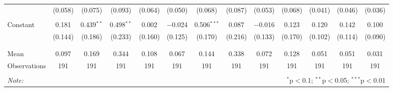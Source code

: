 \begin{tabular}{@{\extracolsep{5pt}}lcccccccccccc}
  & (0.058) & (0.075) & (0.093) & (0.064) & (0.050) & (0.068) & (0.087) & (0.053) & (0.068) & (0.041) & (0.046) & (0.036) \\ 
  & & & & & & & & & & & & \\ 
 Constant & 0.181 & 0.439$^{**}$ & 0.498$^{**}$ & 0.002 & $-$0.024 & 0.506$^{***}$ & 0.087 & $-$0.016 & 0.123 & 0.120 & 0.142 & 0.100 \\ 
  & (0.144) & (0.186) & (0.233) & (0.160) & (0.125) & (0.170) & (0.216) & (0.133) & (0.170) & (0.102) & (0.114) & (0.090) \\ 
  & & & & & & & & & & & & \\ 
\hline \\[-1.8ex] 
Mean & 0.097 & 0.169 & 0.344 & 0.108 & 0.067 & 0.144 & 0.338 & 0.072 & 0.128 & 0.051 & 0.051 & 0.031 \\ 
Observations & 191 & 191 & 191 & 191 & 191 & 191 & 191 & 191 & 191 & 191 & 191 & 191 \\ 
\hline 
\hline \\[-1.8ex] 
\textit{Note:}  & \multicolumn{12}{r}{$^{*}$p$<$0.1; $^{**}$p$<$0.05; $^{***}$p$<$0.01} \\ 
\end{tabular} 
